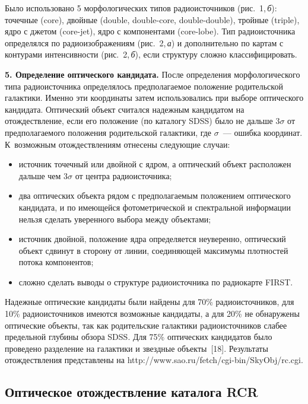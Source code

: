 \begin{multicols}{2}
      Было использовано 5 морфологических типов радиоисточников (рис.~1,\,\textit{б}): 
точечные ({core}), двойные ({double}, {double-core}, {double-double}), 
тройные ({triple}), ядро с джетом ({core-jet}), ядро с компонентами 
      ({core-lobe}). Тип радиоисточника определялся по радиоизображениям (рис.~2,\,\textit{а}) 
      и дополнительно по картам с контурами интенсивности (рис.~2,\,\textit{б}), если 
структуру сложно классифицировать.



\textbf{5. Определение оптического кандидата.} После определения морфологического типа 
радиоисточника определялось предполагаемое положение родительской галактики. Именно 
эти координаты затем использовались при выборе оптического кандидата. Оптический 
объект считался надежным кандидатом на отождествление, если его положение (по каталогу 
SDSS) было не дальше $3\sigma$ от предполагаемого положения родительской галактики, 
где $\sigma$~--- ошибка координат. К~возможным отождествлениям отнесены следующие 
случаи:
\begin{itemize}
\item источник точечный или двойной с ядром, а оптический объект расположен дальше 
чем $3\sigma$ от центра радиоисточника; 
\item два оптических объекта рядом с предполагаемым положением оптического кандидата, 
и по имеющейся фотометрической и спектральной информации нельзя сделать уверенного 
выбора между объектами; 
\item источник двойной, положение ядра определяется неуверенно, оптический объект 
сдвинут в сторону от линии, соединяющей максимумы плотностей потока компонентов;
\item сложно сделать выводы о структуре радиоисточника по радиокарте FIRST.
\end{itemize}

Надежные оптические кандидаты были найде\-ны для 70\% радиоисточников, для 10\% 
радиоисточников имеются возможные кандидаты, а для 20\% не обнаружены оптические 
объекты, так как родительские галактики радиоисточников слабее предельной глубины 
обзора SDSS. Для 75\% оптических кандидатов было проведено разделение на галактики и 
звездные объекты~[18]. Результаты отождествления представлены на {\sf 
http://www.sao.ru/fetch/cgi-bin/SkyObj/rc.cgi}.

\subsection{Оптическое отождествление каталога RCR}
      

\end{multicols}
